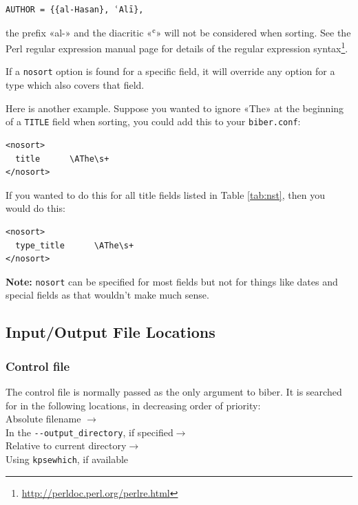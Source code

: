 \documentclass{ltxdockit}
\begin{document}
\begin{verbatim}
AUTHOR = {{al-Hasan}, ʿAlī},
\end{verbatim}

\noindent the prefix «al-» and the diacritic «ʿ» will not be considered
when sorting. See the Perl regular expression manual page for
details of the regular expression syntax\footnote{\url{http://perldoc.perl.org/perlre.html}}.

If a \verb+nosort+ option is found for a specific field, it will override
any option for a type which also covers that field.

Here is another example. Suppose you wanted to ignore «The» at the
beginning of a \verb+TITLE+ field when sorting, you could add this to your
\verb+biber.conf+:

\begin{verbatim}
<nosort>
  title      \AThe\s+
</nosort>
\end{verbatim}

\noindent If you wanted to do this for all title fields listed in Table
\ref{tab:nst}, then you would do this:

\begin{verbatim}
<nosort>
  type_title      \AThe\s+
</nosort>
\end{verbatim}

\noindent \textbf{Note:} \verb+nosort+ can be specified for most fields but
not for things like dates and special fields as that wouldn't make much sense.

\subsection{Input/Output File Locations}

\subsubsection{Control file}\label{loc:cf}

The control file is normally passed as the only argument to biber. It is
searched for in the following locations, in decreasing order of
priority:\\[2ex]

\noindent Absolute filename $\rightarrow$\\
\hspace*{1em}In the \verb+--output_directory+, if specified$\rightarrow$\\
\hspace*{2em}Relative to current directory$\rightarrow$\\
\hspace*{3em}Using \verb+kpsewhich+, if available
\end{document}
